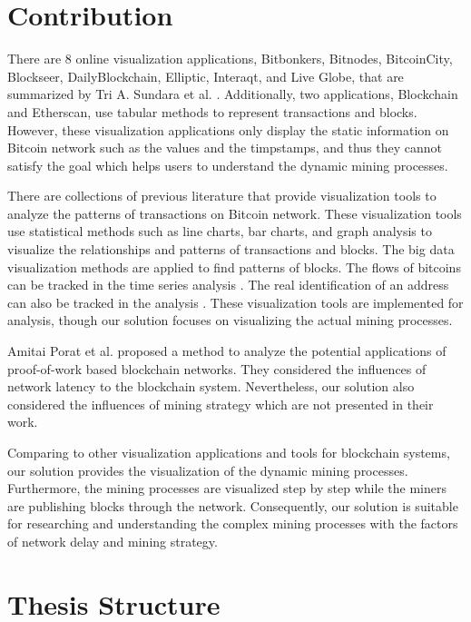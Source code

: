 \section{Contribution}

There are 8 online visualization applications, Bitbonkers, Bitnodes, BitcoinCity, Blockseer, DailyBlockchain, Elliptic, Interaqt, and Live Globe, that are summarized by Tri A. Sundara et al. \cite{Sundara2017}. Additionally, two applications, Blockchain and Etherscan, use tabular methods to represent transactions and blocks. However, these visualization applications only display the static information on Bitcoin network such as the values and the timpstamps, and thus they cannot satisfy the goal which helps users to understand the dynamic mining processes. 

There are collections of previous literature that provide visualization tools to analyze the patterns of transactions on Bitcoin network. These visualization tools \cite{Kuzuno2017, Saublet2015, Fleder2015, Baumann2014} use statistical methods such as line charts, bar charts, and graph analysis to visualize the relationships and patterns of transactions and blocks. The big data visualization methods are applied \cite{McGinn2016} to find patterns of blocks. The flows of bitcoins can be tracked in the time series analysis \cite{Battista2015}. The real identification of an address can also be tracked in the analysis \cite{Kuzuno2017}. These visualization tools are implemented for analysis, though our solution focuses on visualizing the actual mining processes. 
 
Amitai Porat et al. \cite{Porat} proposed a method to analyze the potential applications of proof-of-work based blockchain networks. They considered the influences of network latency to the blockchain system. Nevertheless, our solution also considered the influences of mining strategy which are not presented in their work.

Comparing to other visualization applications and tools for blockchain systems, our solution provides the visualization of the dynamic mining processes. Furthermore, the mining processes are visualized step by step while the miners are publishing blocks through the network. Consequently, our solution is suitable for researching and understanding the complex mining processes with the factors of network delay and mining strategy.

\section{Thesis Structure}

